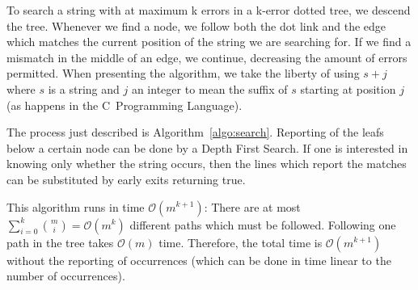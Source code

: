 To search a string with at maximum k errors in a k-error dotted tree, we descend the tree. Whenever we find a node, we follow both the dot link and the edge which matches the current position of the string we are searching for. If we find a mismatch in the middle of an edge, we continue, decreasing the amount of errors permitted. When presenting the algorithm, we take the liberty of using $s+j$ where $s$ is a string and $j$ an integer to mean the suffix of $s$ starting at position $j$ (as happens in the C~Programming Language).



The process just described is Algorithm~\ref{algo:search}. Reporting of the leafs below a certain node can be done by a Depth First Search. If one is interested in knowing only whether the string occurs, then the lines which report the matches can be substituted by early exits returning true.

This algorithm runs in time $\mathcal{O}(m^{k+1})$: There are at most $\sum_{i=0}^{k}{m \choose i}=\mathcal{O}(m^k)$ different paths which must be followed. Following one path in the tree takes $\mathcal{O}(m)$ time. Therefore, the total time is $\mathcal{O}(m^{k+1})$ without the reporting of occurrences (which can be done in time linear to the number of occurrences).
